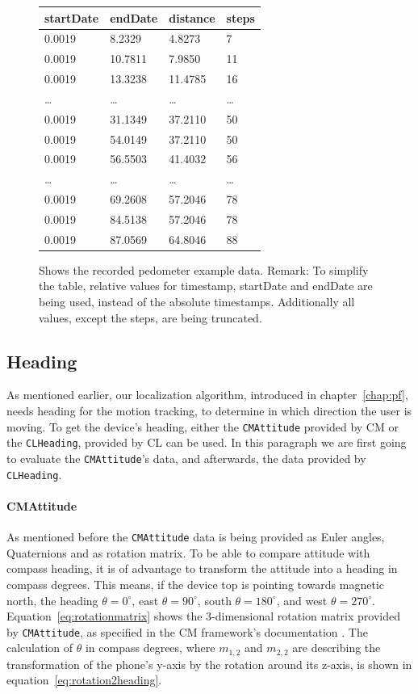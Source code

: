 \begin{figure}
\begin{tabular}{*{4}{l}}
startDate & endDate & distance & steps\\
\hline
0.0019 & 8.2329 & 4.8273 & 7\\
0.0019 & 10.7811 & 7.9850 & 11\\
0.0019 & 13.3238 & 11.4785 & 16\\
\dots & \dots & \dots & \dots\\
0.0019 & 31.1349 & 37.2110 & 50\\
0.0019 & 54.0149 & 37.2110 & 50\\
0.0019 & 56.5503 & 41.4032 & 56\\
\dots & \dots & \dots & \dots\\
0.0019 & 69.2608 & 57.2046 & 78\\
0.0019 & 84.5138 & 57.2046 & 78\\
0.0019 & 87.0569 & 64.8046 & 88
\end{tabular}
\caption{Shows the recorded pedometer example data.
Remark: To simplify the table, relative values for timestamp, startDate and endDate are being used, instead of the absolute timestamps. Additionally all values, except the steps, are being truncated.}
\label{fig:eval:pedometerExampleData}
\end{figure}


\subsection{Heading}
As mentioned earlier, our localization algorithm, introduced in chapter~\ref{chap:pf}, needs heading for the motion tracking, to determine in which direction the user is moving. To get the device's heading, either the \texttt{CMAttitude} provided by \ac{CM} or the \texttt{CLHeading}, provided by \ac{CL} can be used. In this paragraph we are first going to evaluate the \texttt{CMAttitude}'s data, and afterwards, the data provided by \texttt{CLHeading}.

\paragraph{CMAttitude} As mentioned before the \texttt{CMAttitude} data is being provided as Euler angles, Quaternions and as rotation matrix. To be able to compare attitude with compass heading, it is of advantage to transform the attitude into a heading in compass degrees. This means, if the device top is pointing towards magnetic north, the heading $\theta = 0^{\circ}$, east $\theta = 90^{\circ}$, south $\theta = 180^{\circ}$, and west $\theta = 270^{\circ}$. Equation~\ref{eq:rotationmatrix} shows the 3-dimensional rotation matrix provided by \texttt{CMAttitude}, as specified in the \ac{CM} framework's documentation \citep{apple:ios_doc_cm}. The calculation of $\theta$ in compass degrees, where $m_{1,2}$ and $m_{2,2}$ are describing the transformation of the phone's y-axis by the rotation around its z-axis, is shown in equation~\ref{eq:rotation2heading}.

